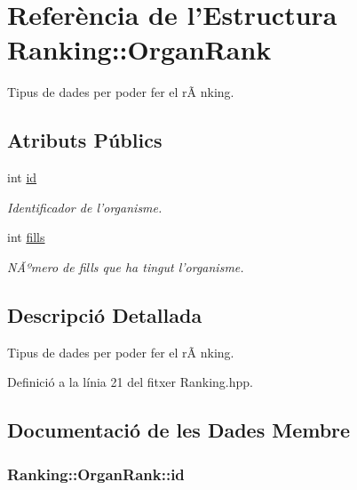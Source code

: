 \hypertarget{struct_ranking_1_1_organ_rank}{\section{Referència de l'Estructura Ranking\-:\-:Organ\-Rank}
\label{struct_ranking_1_1_organ_rank}
}


Tipus de dades per poder fer el rÃ nking.  


\subsection*{Atributs Públics}
\begin{DoxyCompactItemize}
\item 
int \hyperlink{struct_ranking_1_1_organ_rank_ac2d4f698161d7410be2d7a9e2e96bd5f}{id}
\begin{DoxyCompactList}\small\item\em Identificador de l'organisme. \end{DoxyCompactList}\item 
int \hyperlink{struct_ranking_1_1_organ_rank_a127f9a8768fd7cfda05c3cb2f9f8cfee}{fills}
\begin{DoxyCompactList}\small\item\em NÃºmero de fills que ha tingut l'organisme. \end{DoxyCompactList}\end{DoxyCompactItemize}


\subsection{Descripció Detallada}
Tipus de dades per poder fer el rÃ nking. 

Definició a la línia 21 del fitxer Ranking.\-hpp.



\subsection{Documentació de les Dades Membre}
\hypertarget{struct_ranking_1_1_organ_rank_ac2d4f698161d7410be2d7a9e2e96bd5f}{
\subsubsection[{id}]{\setlength{\rightskip}{0pt plus 5cm}Ranking\-::\-Organ\-Rank\-::id}}\label{struct_ranking_1_1_organ_rank_ac2d4f698161d7410be2d7a9e2e96bd5f}


